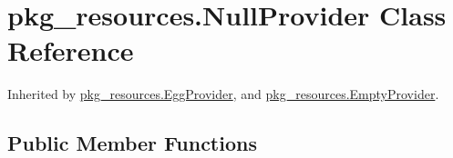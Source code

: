 \hypertarget{classpkg__resources_1_1_null_provider}{}\section{pkg\+\_\+resources.\+Null\+Provider Class Reference}
\label{classpkg__resources_1_1_null_provider}


Inherited by \hyperlink{classpkg__resources_1_1_egg_provider}{pkg\+\_\+resources.\+Egg\+Provider}, and \hyperlink{classpkg__resources_1_1_empty_provider}{pkg\+\_\+resources.\+Empty\+Provider}.

\subsection*{Public Member Functions}
